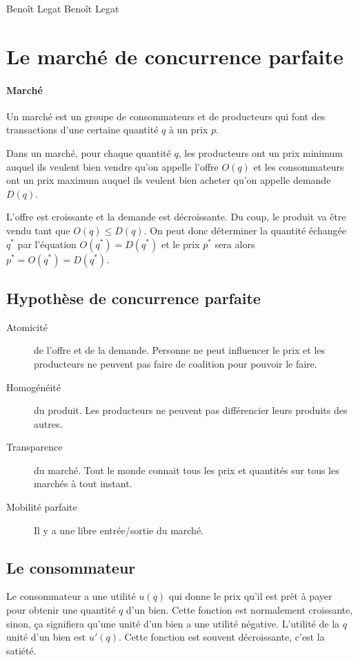 

{Benoît Legat}
{Benoît Legat}

\newcommand{\elasticity}{\varepsilon}
\newcommand{\pcompt}{\pi}
\newcommand{\ppur}{\pi_{\mathrm{pur}}}
\newcommand{\surplus}{s}
\newcommand{\surpluscons}{{S_c}}
\newcommand{\surplusprod}{S_p}
\newcommand{\surpluscoll}{S}

\section{Le marché de concurrence parfaite}
\paragraph{Marché}
Un marché est un groupe de consommateurs et de producteurs
qui font des transactions d'une certaine quantité $q$ à un prix $p$.

Dans un marché, pour chaque quantité $q$, les producteurs ont un prix
minimum auquel ils veulent bien vendre qu'on appelle l'offre $O(q)$
et les consommateurs ont un prix
maximum auquel ils veulent bien acheter qu'on appelle demande $D(q)$.

L'offre est croissante et la demande est décroissante.
Du coup, le produit va être vendu tant que $O(q) \leq D(q)$.
On peut donc déterminer la quantité échangée $q^*$ par l'équation
$O(q^*) = D(q^*)$ et le prix $p^*$ sera alors $p^* = O(q^*) = D(q^*)$.

\subsection{Hypothèse de concurrence parfaite}
\begin{description}
  \item[Atomicité] de l'offre et de la demande.
    Personne ne peut influencer le prix et
    les producteurs ne peuvent pas faire de coalition pour pouvoir le faire.
  \item[Homogénéité] du produit.
    Les producteurs ne peuvent pas différencier leurs produits des autres.
  \item[Transparence] du marché.
    Tout le monde connait tous les prix et quantités sur tous les marchés
    à tout instant.
  \item[Mobilité parfaite]
    Il y a une libre entrée/sortie du marché.
\end{description}

\subsection{Le consommateur}
Le consommateur a une utilité $u(q)$ qui donne le prix qu'il est prêt à payer
pour obtenir une quantité $q$ d'un bien.
Cette fonction est normalement croissante, sinon, ça signifiera qu'une unité
d'un bien a une utilité négative.
L'utilité de la $q$\ieme{} unité d'un bien est $u'(q)$.
Cette fonction est souvent décroissante, c'est la satiété.


